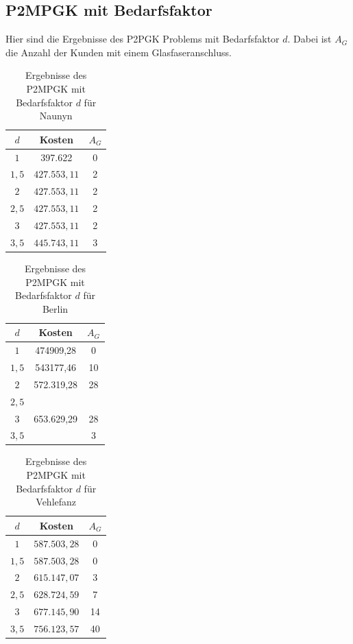 \documentclass[11pt,a4paper]{article}
\theoremstyle{my_th_style1}
\begin{document}
\vspace{3cm}

\subsection*{P2MPGK mit Bedarfsfaktor}
Hier sind die Ergebnisse des P2PGK Problems mit Bedarfsfaktor $d$. Dabei ist $A_G$ die Anzahl der Kunden mit einem Glasfaseranschluss.
\begin{table}[!htbp]
	\centering
		\begin{tabular}{c|c|c}
	\centering
	$d$ & Kosten & $A_G$ \\	
	\hline
	$1$   	 &  397.622 & 0  \\
	$1,5$ 	&   $427.553,11$  & 2  \\
	$2$   	&   $427.553,11$ & 2  \\
	$2,5$   	&   $427.553,11$ & 2  \\
	$3$    &   $427.553,11$ & 2  \\
	$3,5$   	&   $445.743,11$ & 3  \\
\end{tabular}
	\caption{Ergebnisse des P2MPGK mit Bedarfsfaktor $d$ f\"ur Naunyn}
	\label{P2MPGKBedarfN} 
\end{table}

\begin{table}[!htbp]
			\centering
			\begin{tabular}{c|c|c}
				\centering
				$d$ & Kosten & $A_G$ \\	
		\hline
	$1$   	 &  474909,28 & 0  \\
	$1,5$ 	&  543177,46   & 10  \\
	$2$   	& 572.319,28 & 28  \\
	$2,5$  &    &   \\
	$3$    &  653.629,29  & 28  \\
	$3,5$   	&    & 3  \\
			\end{tabular}
			\caption{Ergebnisse des P2MPGK mit Bedarfsfaktor $d$ f\"ur Berlin} 
			\label{P2MPGKBedarfB}
\end{table}



\begin{table}[!htbp]
	\centering
	\begin{tabular}{c|c|c}
		\centering
		$d$ & Kosten & $A_G$ \\	
		\hline
		$1$   	 &  \(587.503,28\) & 0  \\
		$1,5$ 	&   $587.503,28$  & 0  \\
		$2$   	&   $615.147,07$ & 3 \\
		$2,5$   	&   $628.724,59$ & 7 \\
		$3$    &   $677.145,90$ & 14 \\
		$3,5$   	&   $756.123,57$ & 40 \\
	\end{tabular}
	\caption{Ergebnisse des P2MPGK mit Bedarfsfaktor $d$ f\"ur Vehlefanz} 
	\label{P2MPGKBedarfV}
\end{table}
\end{document}
